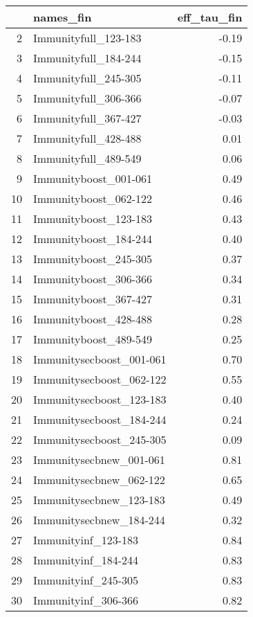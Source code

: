 \begin{table}[ht]
\centering
\begin{tabular}{rlr}
  \hline
 & names\_fin & eff\_tau\_fin \\ 
  \hline
2 & Immunityfull\_123-183 & -0.19 \\ 
  3 & Immunityfull\_184-244 & -0.15 \\ 
  4 & Immunityfull\_245-305 & -0.11 \\ 
  5 & Immunityfull\_306-366 & -0.07 \\ 
  6 & Immunityfull\_367-427 & -0.03 \\ 
  7 & Immunityfull\_428-488 & 0.01 \\ 
  8 & Immunityfull\_489-549 & 0.06 \\ 
  9 & Immunityboost\_001-061 & 0.49 \\ 
  10 & Immunityboost\_062-122 & 0.46 \\ 
  11 & Immunityboost\_123-183 & 0.43 \\ 
  12 & Immunityboost\_184-244 & 0.40 \\ 
  13 & Immunityboost\_245-305 & 0.37 \\ 
  14 & Immunityboost\_306-366 & 0.34 \\ 
  15 & Immunityboost\_367-427 & 0.31 \\ 
  16 & Immunityboost\_428-488 & 0.28 \\ 
  17 & Immunityboost\_489-549 & 0.25 \\ 
  18 & Immunitysecboost\_001-061 & 0.70 \\ 
  19 & Immunitysecboost\_062-122 & 0.55 \\ 
  20 & Immunitysecboost\_123-183 & 0.40 \\ 
  21 & Immunitysecboost\_184-244 & 0.24 \\ 
  22 & Immunitysecboost\_245-305 & 0.09 \\ 
  23 & Immunitysecbnew\_001-061 & 0.81 \\ 
  24 & Immunitysecbnew\_062-122 & 0.65 \\ 
  25 & Immunitysecbnew\_123-183 & 0.49 \\ 
  26 & Immunitysecbnew\_184-244 & 0.32 \\ 
  27 & Immunityinf\_123-183 & 0.84 \\ 
  28 & Immunityinf\_184-244 & 0.83 \\ 
  29 & Immunityinf\_245-305 & 0.83 \\ 
  30 & Immunityinf\_306-366 & 0.82 \\ 

\end{tabular}
\end{table}
